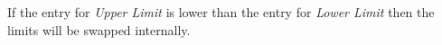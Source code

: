If the  entry for \textit{Upper Limit} is lower than the entry for \textit{Lower Limit} then the limits will be swapped internally.




